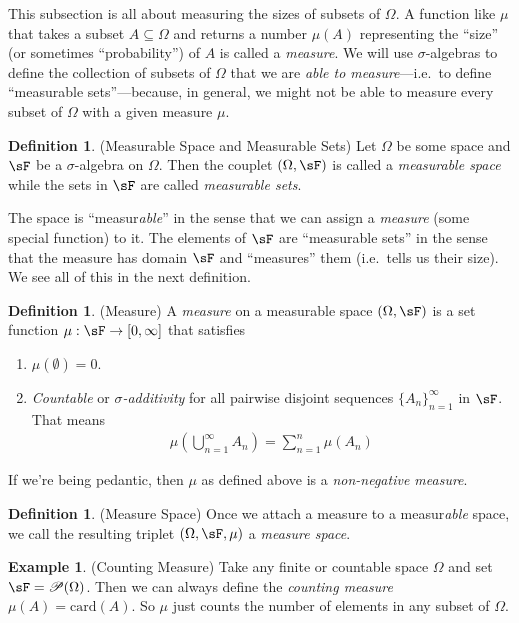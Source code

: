 \documentclass[12pt]{article}
\theoremstyle{plain}
\theoremstyle{definition}
\newtheorem{defn}[thm]{Definition}
\newtheorem{ex}[thm]{Example}
\theoremstyle{remark}
\begin{document}
This subsection is all about measuring the sizes of subsets of $\Omega$.
A function like $\mu$ that takes a subset $A\subseteq\Omega$ and returns
a number $\mu(A)$ representing the ``size'' (or sometimes
``probability'') of $A$ is called a \emph{measure}.
We will use $\sigma$-algebras to define the collection
of subsets of $\Omega$ that we are \emph{able to measure}---i.e.\ to
define ``measurable sets''---because, in general, we might not be able
to measure every subset of $\Omega$ with a given measure $\mu$.


\begin{defn}(Measurable Space and Measurable Sets)
Let $\Omega$ be some space and $\sF$ be a $\sigma$-algebra on
$\Omega$. Then the couplet $(\Omega, \sF)$ is called a
\emph{measurable space} while the sets in $\sF$ are called
\emph{measurable sets}.

The space is ``measur\emph{able}'' in the sense that we can assign a
\emph{measure} (some special function) to it. The elements of $\sF$ are
``measurable sets'' in the sense that the measure has domain $\sF$ and
``measures'' them (i.e.\ tells us their size). We see all of this in the
next definition.
\end{defn}

\begin{defn}(Measure)
\label{defn:measure}
A \emph{measure} on a measurable space $(\Omega,\sF)$ is a set function
$\mu: \sF \rightarrow [0,\infty]$ that satisfies
\begin{enumerate}
  \item $\mu(\emptyset)=0$.
  \item \emph{Countable} or \emph{$\sigma$-additivity} for all pairwise
    disjoint sequences $\{A_n\}_{n=1}^\infty$ in $\sF$. That means
    \begin{align*}
      \mu\left(\bigcup^\infty_{n=1}A_n\right)
      = \sum^n_{n=1} \mu(A_n)
    \end{align*}
\end{enumerate}
If we're being pedantic, then $\mu$ as defined above is a
\emph{non-negative measure}.
\end{defn}

\begin{defn}(Measure Space)
Once we attach a measure to a measur\emph{able} space, we call the
resulting triplet $(\Omega,\sF,\mu)$ a \emph{measure space}.
\end{defn}

\begin{ex}(Counting Measure)
Take any finite or countable space $\Omega$ and set
$\sF=\mathscr{P}(\Omega)$. Then we can always define the
\emph{counting measure} $\mu(A) = \text{card}(A)$.  So $\mu$ just counts
the number of elements in any subset of $\Omega$.
\end{ex}
\end{document}
